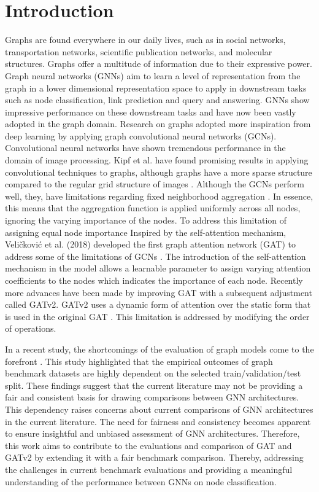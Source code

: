 \documentclass[runningheads]{llncs}
\begin{document}
\section{Introduction}
Graphs are found everywhere in our daily lives, such as in social networks,
transportation networks, scientific publication networks, and molecular structures. Graphs offer a multitude of information due to their expressive
power. Graph neural networks (GNNs) aim to learn a level of representation 
from the graph in a lower dimensional representation space to apply 
in downstream tasks such as node classification, link prediction and 
query and answering. GNNs show impressive performance on these downstream tasks and have now been vastly adopted in the graph domain. Research on graphs adopted more inspiration from deep learning by applying graph convolutional neural networks (GCNs). Convolutional neural networks have shown tremendous performance in the domain of image processing. Kipf et al. have found promising results in applying convolutional techniques to graphs, although graphs have a more sparse structure compared to the regular grid structure of images \cite{Kipf2016}. Although the GCNs perform well, they, have limitations regarding fixed neighborhood aggregation \cite{magner2020fundamental}. In essence, this means that the aggregation function is applied uniformly across all nodes, ignoring the varying importance of the nodes. To address this limitation of assigning equal node importance Inspired by the self-attention mechanism, Veličković et al. (2018) developed the first graph attention network (GAT) to address some of the limitations of GCNs \cite{veličković2018graph} \cite{Vaswani2017}. The introduction of the self-attention mechanism in the model allows a learnable parameter to assign varying attention coefficients to the nodes which indicates the importance of each node. Recently more advances have been made by improving GAT with a subsequent adjustment called GATv2. 
GATv2 uses a dynamic form of attention over the static form that is used in the original GAT \cite{veličković2018graph}\cite{Brody2021}. This limitation is addressed by
modifying the order of operations. 

In a recent study, the shortcomings of the evaluation of graph models come to the forefront \cite{Oleksandr}. This study highlighted that the empirical outcomes of graph benchmark datasets are highly dependent on the selected train/validation/test split. These findings suggest that the current literature may not be providing a fair and consistent basis for drawing comparisons between GNN architectures. This dependency raises concerns about current comparisons of GNN architectures in the current literature. The need for fairness and consistency becomes apparent to ensure insightful and unbiased assessment of GNN architectures. Therefore, this work aims to contribute to the evaluations and comparison of GAT and GATv2 by extending it with a fair benchmark comparison. Thereby, addressing the challenges in current benchmark evaluations and providing a meaningful understanding of the performance between GNNs on node classification. 
\end{document}
